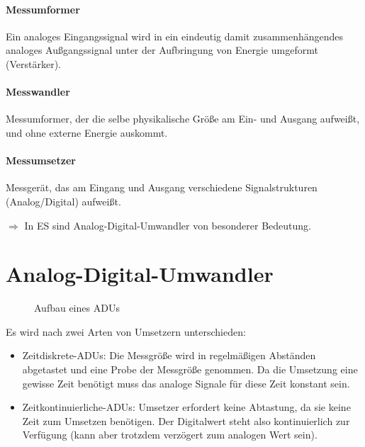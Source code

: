 
\paragraph{Messumformer} 
Ein analoges Eingangssignal wird in ein eindeutig damit zusammenhängendes analoges Außgangssignal unter der Aufbringung von Energie umgeformt (Verstärker).

\paragraph{Messwandler}
Messumformer, der die selbe physikalische Größe am Ein- und Ausgang aufweißt, und ohne externe Energie auskommt.

\paragraph{Messumsetzer}
Messgerät, das am Eingang und Ausgang verschiedene Signalstrukturen (Analog/Digital) aufweißt.

$\Rightarrow$ In ES sind Analog-Digital-Umwandler von besonderer Bedeutung.

\section{Analog-Digital-Umwandler}
\begin{figure}[H]
    \centering
    \caption{Aufbau eines ADUs}
\end{figure}

Es wird nach zwei Arten von Umsetzern unterschieden:
\begin{itemize}
    \item Zeitdiskrete-ADUs: Die Messgröße wird in regelmäßigen Abständen abgetastet und eine Probe der Messgröße genommen. Da die Umsetzung eine gewisse Zeit
        benötigt muss das analoge Signale für diese Zeit konstant sein.
    \item Zeitkontinuierliche-ADUs: Umsetzer erfordert keine Abtastung, da sie keine Zeit zum Umsetzen benötigen. Der Digitalwert steht also kontinuierlich zur
        Verfügung (kann aber trotzdem verzögert zum analogen Wert sein).
\end{itemize}

